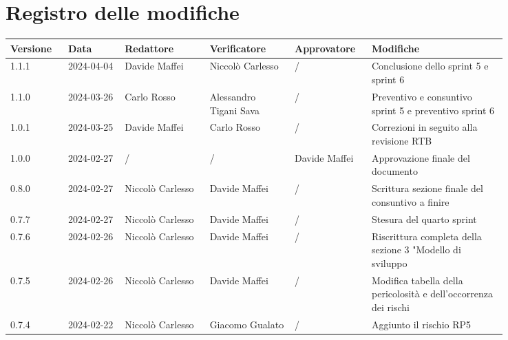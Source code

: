 \section*{Registro delle modifiche}
 {
  \renewcommand{\arraystretch}{1.5}
  \scriptsize
  \begin{longtable}{p{0.10\linewidth}p{0.10\linewidth}p{0.15\linewidth}p{0.15\linewidth}p{0.10\linewidth}p{0.24\linewidth}}
	  \textbf{Versione} & \textbf{Data} & \textbf{Redattore} & \textbf{Verificatore}  & \textbf{Approvatore} & \textbf{Modifiche}                                                \\
	  \toprule
	  1.1.1             & 2024-04-04    & Davide Maffei      & Niccolò Carlesso      & /                    & Conclusione dello sprint 5 e sprint 6            \\
	  \hline
	  1.1.0             & 2024-03-26    & Carlo Rosso        & Alessandro Tigani Sava                      & /                    & Preventivo e consuntivo sprint 5 e preventivo sprint 6            \\
	  \hline
	  1.0.1             & 2024-03-25    & Davide Maffei      & Carlo Rosso            & /                    & Correzioni in seguito alla revisione RTB                          \\
	  \hline
	  1.0.0             & 2024-02-27    & /                  & /                      & Davide Maffei        & Approvazione finale del documento                                 \\
	  \hline
	  0.8.0             & 2024-02-27    & Niccolò Carlesso   & Davide Maffei          & /                    & Scrittura sezione finale del consuntivo a finire                  \\
	  \hline
	  0.7.7             & 2024-02-27    & Niccolò Carlesso   & Davide Maffei          & /                    & Stesura del quarto sprint                                         \\
	  \hline
	  0.7.6             & 2024-02-26    & Niccolò Carlesso   & Davide Maffei          & /                    & Riscrittura completa della sezione 3 "Modello di sviluppo         \\
	  \hline
	  0.7.5             & 2024-02-26    & Niccolò Carlesso   & Davide Maffei          & /                    & Modifica tabella della pericolosità e dell’occorrenza dei rischi  \\
	  \hline
	  0.7.4             & 2024-02-22    & Niccolò Carlesso   & Giacomo Gualato        & /                    & Aggiunto il rischio RP5                                           \\

\end{longtable}}
